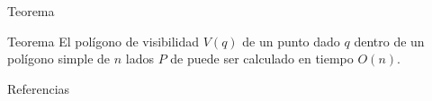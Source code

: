 \documentclass[aspectratio=169,xcolor=dvipsnames, t]{beamer}
\begin{document}

\begin{frame}{Teorema}
    \begin{block}{Teorema}
        El polígono de visibilidad $V(q)$ de un punto dado $q$ dentro de un polígono simple de $n$ lados $P$ de puede ser calculado en tiempo $O(n)$.
    \end{block}
\end{frame}

\begin{frame}[allowframebreaks]{Referencias}
\end{frame}

\makefinalpage
\end{document}
